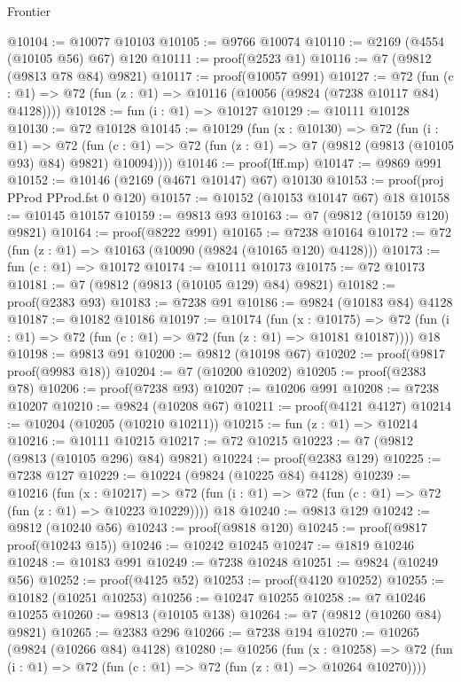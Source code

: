 \begin{lexlean}{Frontier}
\begin{coremodule}
@10104 := @10077 @10103
@10105 := @9766 @10074
@10110 := @2169 (@4554 (@10105 @56) @67) @120
@10111 := proof(@2523 @1)
@10116 := @7 (@9812 (@9813 @78 @84) @9821)
@10117 := proof(@10057 @991)
@10127 := @72
    (fun (c : @1) => @72 (fun (z : @1) => @10116 (@10056 (@9824 (@7238 @10117 @84) @4128))))
@10128 := fun (i : @1) => @10127
@10129 := @10111 @10128
@10130 := @72 @10128
@10145 := @10129
    (fun (x : @10130) =>
    @72
      (fun (i : @1) =>
      @72 (fun (c : @1) => @72 (fun (z : @1) => @7 (@9812 (@9813 (@10105 @93) @84) @9821) @10094))))
@10146 := proof(Iff.mp)
@10147 := @9869 @991
@10152 := @10146 (@2169 (@4671 @10147) @67) @10130
@10153 := proof(proj PProd PProd.fst 0 @120)
@10157 := @10152 (@10153 @10147 @67) @18
@10158 := @10145 @10157
@10159 := @9813 @93
@10163 := @7 (@9812 (@10159 @120) @9821)
@10164 := proof(@8222 @991)
@10165 := @7238 @10164
@10172 := @72 (fun (z : @1) => @10163 (@10090 (@9824 (@10165 @120) @4128)))
@10173 := fun (c : @1) => @10172
@10174 := @10111 @10173
@10175 := @72 @10173
@10181 := @7 (@9812 (@9813 (@10105 @129) @84) @9821)
@10182 := proof(@2383 @93)
@10183 := @7238 @91
@10186 := @9824 (@10183 @84) @4128
@10187 := @10182 @10186
@10197 := @10174
    (fun (x : @10175) =>
    @72 (fun (i : @1) => @72 (fun (c : @1) => @72 (fun (z : @1) => @10181 @10187))))
    @18
@10198 := @9813 @91
@10200 := @9812 (@10198 @67)
@10202 := proof(@9817 proof(@9983 @18))
@10204 := @7 (@10200 @10202)
@10205 := proof(@2383 @78)
@10206 := proof(@7238 @93)
@10207 := @10206 @991
@10208 := @7238 @10207
@10210 := @9824 (@10208 @67)
@10211 := proof(@4121 @4127)
@10214 := @10204 (@10205 (@10210 @10211))
@10215 := fun (z : @1) => @10214
@10216 := @10111 @10215
@10217 := @72 @10215
@10223 := @7 (@9812 (@9813 (@10105 @296) @84) @9821)
@10224 := proof(@2383 @129)
@10225 := @7238 @127
@10229 := @10224 (@9824 (@10225 @84) @4128)
@10239 := @10216
    (fun (x : @10217) =>
    @72 (fun (i : @1) => @72 (fun (c : @1) => @72 (fun (z : @1) => @10223 @10229))))
    @18
@10240 := @9813 @129
@10242 := @9812 (@10240 @56)
@10243 := proof(@9818 @120)
@10245 := proof(@9817 proof(@10243 @15))
@10246 := @10242 @10245
@10247 := @1819 @10246
@10248 := @10183 @991
@10249 := @7238 @10248
@10251 := @9824 (@10249 @56)
@10252 := proof(@4125 @52)
@10253 := proof(@4120 @10252)
@10255 := @10182 (@10251 @10253)
@10256 := @10247 @10255
@10258 := @7 @10246 @10255
@10260 := @9813 (@10105 @138)
@10264 := @7 (@9812 (@10260 @84) @9821)
@10265 := @2383 @296
@10266 := @7238 @194
@10270 := @10265 (@9824 (@10266 @84) @4128)
@10280 := @10256
    (fun (x : @10258) =>
    @72 (fun (i : @1) => @72 (fun (c : @1) => @72 (fun (z : @1) => @10264 @10270))))

\end{coremodule}
\end{lexlean}
